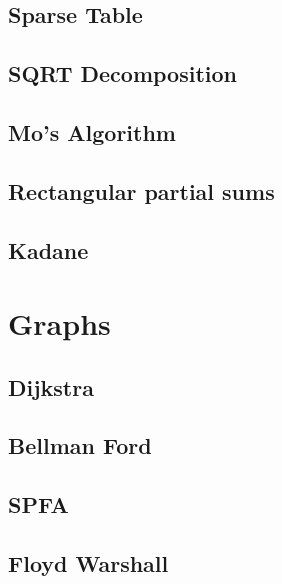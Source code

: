 \subsection{Sparse Table}
\raggedbottom
\hrulefill
\subsection{SQRT Decomposition}
\raggedbottom
\hrulefill
\subsection{Mo's Algorithm}
\raggedbottom
\hrulefill
\subsection{Rectangular partial sums}
\raggedbottom
\hrulefill
\subsection{Kadane}
\raggedbottom
\hrulefill

\section{Graphs}
\subsection{Dijkstra}
\raggedbottom
\hrulefill
\subsection{Bellman Ford}
\raggedbottom
\hrulefill
\subsection{SPFA}
\raggedbottom
\hrulefill
\subsection{Floyd Warshall}
\raggedbottom
\hrulefill
